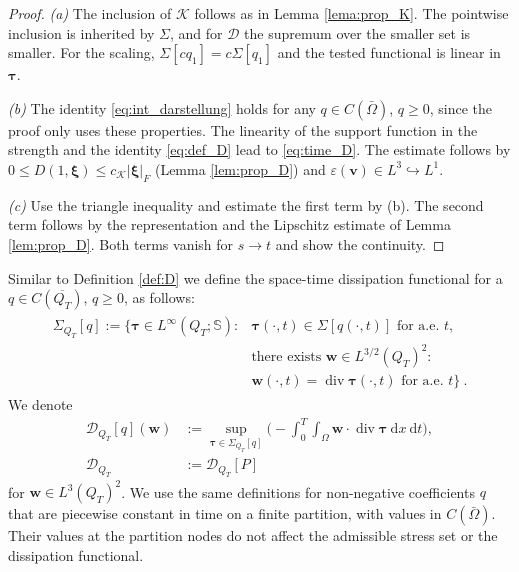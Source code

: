 \documentclass{article}
\theoremstyle{definition}
\newcommand{\bfv}{\boldsymbol{v}}
\newcommand{\bfw}{\boldsymbol{w}}
\newcommand{\bftau}{\boldsymbol{\tau}}
\newcommand{\bfxi}{\boldsymbol{\xi}}
\newcommand{\K}{\mathcal{K}}
\newcommand{\D}{\mathcal{D}}
\newcommand{\dd}{\:\mathrm{d}}
\renewcommand\div{\operatorname{\mathrm{div}}}
\begin{document}
\begin{proof}
    \textit{(a)} The inclusion of $\K$ follows as in Lemma \ref{lema:prop_K}.
    The pointwise inclusion is inherited by $\Sigma$, and for $\D$ the supremum
    over the smaller set is smaller. For the scaling, $\Sigma[cq_1]=c\Sigma[q_1]$ and
    the tested functional is linear in $\bftau$.

    \textit{(b)} The identity \eqref{eq:int_darstellung} holds for any $q\in C(\bar\Omega)$, $q\geq 0$, since the proof only uses these properties. The linearity of
    the support function in the strength and the identity \eqref{eq:def_D} lead to \eqref{eq:time_D}.
    The estimate follows by $0\leq D(1,\bfxi) \leq c_\K |\bfxi|_F$ (Lemma \ref{lem:prop_D}) and $\varepsilon(\bfv)\in L^3\hookrightarrow L^1$.

    \textit{(c)} Use the triangle inequality and estimate the first term by (b).
    The second term follows by the representation and the Lipschitz estimate of Lemma \ref{lem:prop_D}. Both terms vanish for $s\rightarrow t$ and show the continuity.
\end{proof}

Similar to Definition \ref{def:D} we define the space-time dissipation functional
for a $q\in C(\overline{Q_T})$, $q\geq 0$, as follows:
\begin{align*}
    \begin{split}
    \Sigma_{Q_T}[q]:= \{ \bftau \in L^\infty(Q_T;\mathbb S) : {}&\bftau(\cdot,t)\in
    \Sigma[q(\cdot,t)] \text{ for a.e.\ } t,\\
    &\text{there exists } \bfw\in L^{3/2}(Q_T)^2:\\
    &\bfw(\cdot,t) = \div \bftau(\cdot,t) \text{ for a.e.\ } t \} \ .
    \end{split}
\end{align*}
We denote
\begin{align*}
    \D_{Q_T}[q](\bfw) &:= \sup_{\bftau\in\Sigma_{Q_T}[q]}\Big(-\int_{0}^{T}\int_{\Omega} \bfw\cdot \div\bftau \dd x \dd t\Big),\\
    \D_{Q_T}&:=\D_{Q_T}[P]
\end{align*}
for $\bfw\in L^3(Q_T)^2$.
We use the same definitions for non-negative coefficients $q$ that are
piecewise constant in time on a finite partition, with values in
$C(\bar\Omega)$. Their values at the partition nodes do not affect the
admissible stress set or the dissipation functional.
\end{document}
